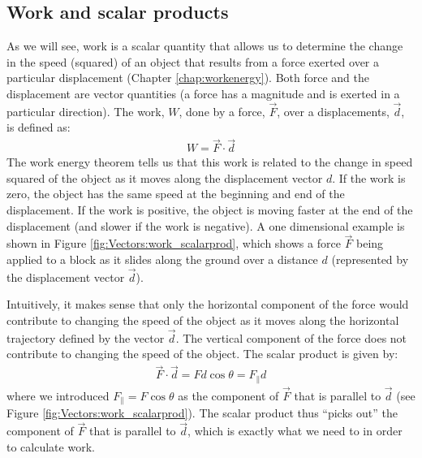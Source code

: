 \subsection{Work and scalar products}
As we will see, work is a scalar quantity that allows us to determine the change in the speed (squared) of an object that results from a force exerted over a particular displacement (Chapter \ref{chap:workenergy}). Both force and the displacement are vector quantities (a force has a magnitude and is exerted in a particular direction). The work, $W$, done by a force, $\vec F$, over a displacements, $\vec d$, is defined as:
\begin{align*}
W = \vec F \cdot \vec d
\end{align*}
The work energy theorem tells us that this work is related to the change in speed squared of the object as it moves along the displacement vector $d$. If the work is zero, the object has the same speed at the beginning and end of the displacement. If the work is positive, the object is moving faster at the end of the displacement (and slower if the work is negative). A one dimensional example is shown in Figure \ref{fig:Vectors:work_scalarprod}, which shows a force $\vec F$ being applied to a block as it slides along the ground over a distance $d$ (represented by the displacement vector $\vec d$).  


Intuitively, it makes sense that only the horizontal component of the force would contribute to changing the speed of the object as it moves along the horizontal trajectory defined by the vector $\vec d$. The vertical component of the force does not contribute to changing the speed of the object. The scalar product is given by:
\begin{align*}
\vec F \cdot \vec d = Fd\cos\theta = F_{\parallel}d
\end{align*}
where we introduced $F_{\parallel} = F\cos\theta$ as the component of $\vec F$ that is parallel to $\vec d$ (see Figure \ref{fig:Vectors:work_scalarprod}). The scalar product thus ``picks out'' the component of $\vec F$ that is parallel to $\vec d$, which is exactly what we need to in order to calculate work. 

